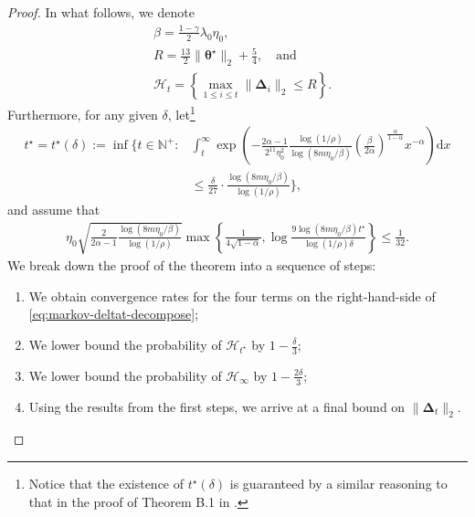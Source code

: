 \begin{proof}
In what follows, we denote
\begin{align*}
& \beta=\frac{1-\gamma}{2}\lambda_0\eta_0,\\ %
& R = \frac{13}{2}\|\bm{\theta}^\star\|_2 + \frac{5}{4}, \quad \text{and}\\
& \mathcal{H}_t = \left\{\max_{1 \leq i \leq t}\|\bm{\Delta}_i\|_2 \leq R\right\}.
\end{align*}
Furthermore, for any given $\delta$, let\footnote{Notice that the existence of $t^\star(\delta)$ is guaranteed by a similar reasoning to that in the proof of Theorem B.1 in \cite{wu2024statistical}.}
\begin{align}\label{eq:defn-tstar-markov}
t^\star = t^\star(\delta):= \inf\Bigg\{t \in \mathbb{N}^+: &\int_t^{\infty} \exp \left(-\frac{2\alpha-1}{2^{11}\eta_0^2} \frac{\log(1/\rho)}{\log(8m\eta_0/\beta)}\left(\frac{\beta}{2\alpha}\right)^{\frac{\alpha}{1-\alpha}}x^{-\alpha}\right)\mathrm{d}x \nonumber \\ 
&\leq \frac{\delta}{27} \cdot \frac{\log(8m\eta_0/\beta)}{\log(1/\rho)}\Bigg\},
\end{align}
and assume that 
\begin{align}\label{eq:deltat-condition-markov}
\eta_0 \sqrt{\frac{2}{2\alpha-1} \frac{\log(8m\eta_0/\beta)}{\log(1/\rho)}} \max\left\{\frac{1}{4\sqrt{1-\alpha}},\log \frac{9\log(8m\eta_0/\beta)t^\star}{\log(1/\rho)\delta}\right\}\leq \frac{1}{32}.
\end{align}
We break down the proof of the theorem into a sequence of steps:
\begin{enumerate}
\item We obtain convergence rates for the four terms on the right-hand-side of \eqref{eq:markov-deltat-decompose};
\item We lower bound  the probability of $\mathcal{H}_{t^\star}$ by %
 $1-\frac{\delta}{3}$;
\item We lower bound the probability of $\mathcal{H}_{\infty}$ by %
  $1-\frac{2\delta}{3}$;
\item Using the results from the first steps, we arrive at a final bound on $\|\bm{\Delta}_t\|_2$.
\end{enumerate}


\end{proof}
